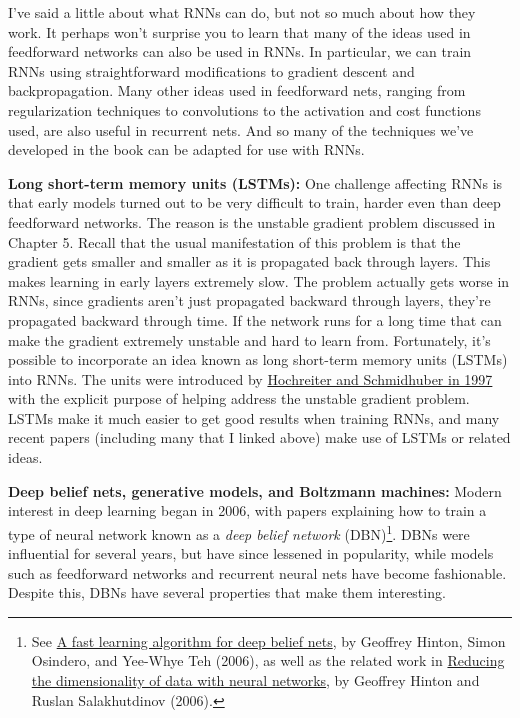 \documentclass[a4paper,twoside,10pt]{book}
\begin{document}
I've said a little about what RNNs can do, but not so much about how they work. It perhaps won't surprise you to learn that many of the ideas used in feedforward networks can also be used in RNNs. In particular, we can train RNNs using straightforward modifications to gradient descent and backpropagation. Many other ideas used in feedforward nets, ranging from regularization techniques to convolutions to the activation and cost functions used, are also useful in recurrent nets. And so many of the techniques we've developed in the book can be adapted for use with RNNs.

\textbf{Long short-term memory units (LSTMs):} One challenge affecting RNNs is that early models turned out to be very difficult to train, harder even than deep feedforward networks. The reason is the unstable gradient problem discussed in Chapter 5. Recall that the usual manifestation of this problem is that the gradient gets smaller and smaller as it is propagated back through layers. This makes learning in early layers extremely slow. The problem actually gets worse in RNNs, since gradients aren't just propagated backward through layers, they're propagated backward through time. If the network runs for a long time that can make the gradient extremely unstable and hard to learn from. Fortunately, it's possible to incorporate an idea known as long short-term memory units (LSTMs) into RNNs. The units were introduced by \href{http://dx.doi.org/10.1162/neco.1997.9.8.1735}{Hochreiter and Schmidhuber in 1997} with the explicit purpose of helping address the unstable gradient problem. LSTMs make it much easier to get good results when training RNNs, and many recent papers (including many that I linked above) make use of LSTMs or related ideas.

\textbf{Deep belief nets, generative models, and Boltzmann machines:} Modern interest in deep learning began in 2006, with papers explaining how to train a type of neural network known as a \textit{deep belief network} (DBN)\footnote{See \href{http://www.cs.toronto.edu/~hinton/absps/fastnc.pdf}{A fast learning algorithm for deep belief nets}, by Geoffrey Hinton, Simon Osindero, and Yee-Whye Teh (2006), as well as the related work in \href{http://www.sciencemag.org/content/313/5786/504.short}{Reducing the dimensionality of data with neural networks}, by Geoffrey Hinton and Ruslan Salakhutdinov (2006).}. DBNs were influential for several years, but have since lessened in popularity, while models such as feedforward networks and recurrent neural nets have become fashionable. Despite this, DBNs have several properties that make them interesting.
\end{document}
